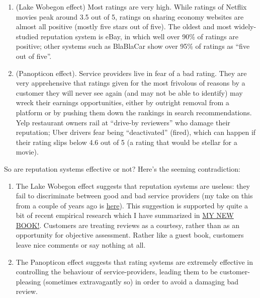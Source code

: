 \documentclass[
  letterpaper,
  DIV=11,
  numbers=noendperiod]{scrartcl}
\begin{document}
\begin{enumerate}
\def\labelenumi{\arabic{enumi}.}
\item
  (Lake Wobegon effect) Most ratings are very high. While ratings of
  Netflix movies peak around 3.5 out of 5, ratings on sharing economy
  websites are almost all positive (mostly five stars out of five). The
  oldest and most widely-studied reputation system is eBay, in which
  well over 90\% of ratings are positive; other systems such as
  BlaBlaCar show over 95\% of ratings as ``five out of five''.
\item
  (Panopticon effect). Service providers live in fear of a bad rating.
  They are very apprehensive that ratings given for the most frivolous
  of reasons by a customer they will never see again (and may not be
  able to identify) may wreck their earnings opportunities, either by
  outright removal from a platform or by pushing them down the rankings
  in search recommendations. Yelp restaurant owners rail at ``drive-by
  reviewers'' who damage their reputation; Uber drivers fear being
  ``deactivated'' (fired), which can happen if their rating slips below
  4.6 out of 5 (a rating that would be stellar for a movie).
\end{enumerate}

So are reputation systems effective or not? Here's the seeming
contradiction:

\begin{enumerate}
\def\labelenumi{\arabic{enumi}.}
\item
  The Lake Wobegon effect suggests that reputation systems are useless:
  they fail to discriminate between good and bad service providers (my
  take on this from a couple of years ago is
  \href{http://tomslee.net/2013/09/some-obvious-things-about-internet-reputation-systems.html}{here}).
  This suggestion is supported by quite a bit of recent empirical
  research which I have summarized in
  \href{http://www.orbooks.com/catalog/whats-yours-is-mine-by-tom-slee/}{MY
  NEW BOOK!}. Customers are treating reviews as a courtesy, rather than
  as an opportunity for objective assessment. Rather like a guest book,
  customers leave nice comments or say nothing at all.
\item
  The Panopticon effect suggests that rating systems are extremely
  effective in controlling the behaviour of service-providers, leading
  them to be customer-pleasing (sometimes extravagantly so) in order to
  avoid a damaging bad review.
\end{enumerate}
\end{document}
